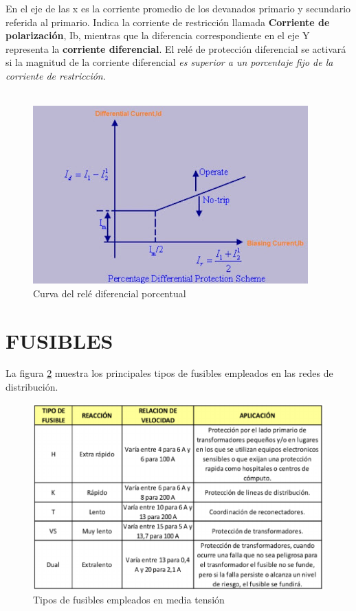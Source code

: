\documentclass[a5paper]{book}%
\begin{document}
En el eje de las x es la corriente promedio de los devanados primario y secundario referida al primario. Indica la corriente de restricción llamada \textbf{Corriente de polarización}, Ib, mientras que la diferencia correspondiente en el eje Y representa la \textbf{corriente diferencial}. El relé de protección diferencial se activará si la magnitud de la corriente diferencial \textit{es superior a un porcentaje fijo de la corriente de restricción}.\\\\
  
    \begin{figure}[H]
      \centering  
      \caption{Curva del relé diferencial porcentual}
      \label{fig:proteccionestrafo}
      \includegraphics[width=\linewidth]{Proteccion-Diferencial-Porcentual}
    \end{figure}

    

\section{FUSIBLES}

La figura \ref{fig:tiposfusibles} muestra  los principales tipos de fusibles empleados en las redes de distribución.

\begin{figure}[H]
	\centering
	\includegraphics[width=0.7\linewidth]{tipos_fusibles}
	\caption{Tipos de fusibles empleados en media tensión}
	\label{fig:tiposfusibles}
\end{figure}
\end{document}

